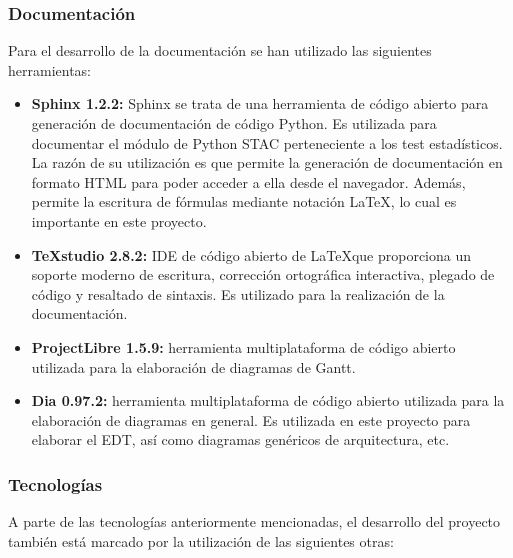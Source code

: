\subsubsection{\textbf{Documentación}}
Para el desarrollo de la documentación se han utilizado las siguientes herramientas:
\begin{itemize}
\item \textbf{Sphinx 1.2.2:} Sphinx se trata de una herramienta de código abierto para generación de documentación de código Python. Es utilizada para documentar el módulo de Python STAC perteneciente a los test estadísticos. La razón de su utilización es que permite la generación de documentación en formato HTML para poder acceder a ella desde el navegador. Además, permite la escritura de fórmulas mediante notación \LaTeX, lo cual es importante en este proyecto.
\item \textbf{TeXstudio 2.8.2:} IDE de código abierto de \LaTeX \space que proporciona un soporte moderno de escritura, corrección ortográfica interactiva, plegado de código y resaltado de sintaxis. Es utilizado para la realización de la documentación.
\item \textbf{ProjectLibre 1.5.9:} herramienta multiplataforma de código abierto utilizada para la elaboración de diagramas de Gantt.
\item \textbf{Dia 0.97.2:} herramienta multiplataforma de código abierto utilizada para la elaboración de diagramas en general. Es utilizada en este proyecto para elaborar el EDT, así como diagramas genéricos de arquitectura, etc.
\end{itemize}

\subsubsection{\textbf{Tecnologías}} \label{tecnologias}
A parte de las tecnologías anteriormente mencionadas, el desarrollo del proyecto también está marcado por la utilización de las siguientes otras:


